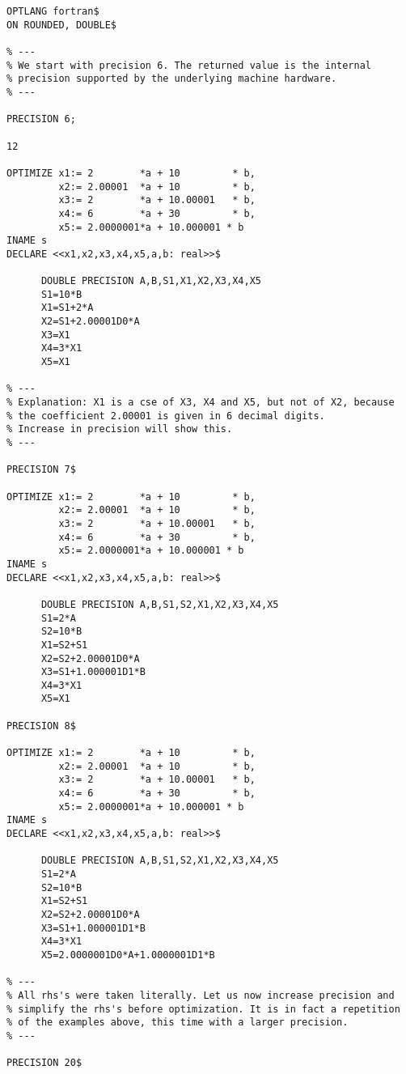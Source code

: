 \example\label{ex:6.2}
{\small
\begin{verbatim}
OPTLANG fortran$
ON ROUNDED, DOUBLE$

% ---
% We start with precision 6. The returned value is the internal
% precision supported by the underlying machine hardware.
% ---

PRECISION 6;

12

OPTIMIZE x1:= 2        *a + 10         * b,
         x2:= 2.00001  *a + 10         * b,
         x3:= 2        *a + 10.00001   * b,
         x4:= 6        *a + 30         * b,
         x5:= 2.0000001*a + 10.000001 * b
INAME s
DECLARE <<x1,x2,x3,x4,x5,a,b: real>>$

      DOUBLE PRECISION A,B,S1,X1,X2,X3,X4,X5
      S1=10*B
      X1=S1+2*A
      X2=S1+2.00001D0*A
      X3=X1
      X4=3*X1
      X5=X1

% ---
% Explanation: X1 is a cse of X3, X4 and X5, but not of X2, because
% the coefficient 2.00001 is given in 6 decimal digits.
% Increase in precision will show this.
% ---

PRECISION 7$

OPTIMIZE x1:= 2        *a + 10         * b,
         x2:= 2.00001  *a + 10         * b,
         x3:= 2        *a + 10.00001   * b,
         x4:= 6        *a + 30         * b,
         x5:= 2.0000001*a + 10.000001 * b
INAME s
DECLARE <<x1,x2,x3,x4,x5,a,b: real>>$

      DOUBLE PRECISION A,B,S1,S2,X1,X2,X3,X4,X5
      S1=2*A
      S2=10*B
      X1=S2+S1
      X2=S2+2.00001D0*A
      X3=S1+1.000001D1*B
      X4=3*X1
      X5=X1

PRECISION 8$

OPTIMIZE x1:= 2        *a + 10         * b,
         x2:= 2.00001  *a + 10         * b,
         x3:= 2        *a + 10.00001   * b,
         x4:= 6        *a + 30         * b,
         x5:= 2.0000001*a + 10.000001 * b
INAME s
DECLARE <<x1,x2,x3,x4,x5,a,b: real>>$

      DOUBLE PRECISION A,B,S1,S2,X1,X2,X3,X4,X5
      S1=2*A
      S2=10*B
      X1=S2+S1
      X2=S2+2.00001D0*A
      X3=S1+1.000001D1*B
      X4=3*X1
      X5=2.0000001D0*A+1.0000001D1*B

% ---
% All rhs's were taken literally. Let us now increase precision and
% simplify the rhs's before optimization. It is in fact a repetition
% of the examples above, this time with a larger precision.
% ---

PRECISION 20$


\end{verbatim}}
